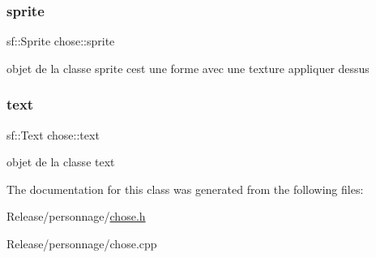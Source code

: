\subsubsection{\texorpdfstring{sprite}{sprite}}
{\footnotesize\ttfamily sf\+::\+Sprite chose\+::sprite}

objet de la classe sprite c\textquotesingle{}est une forme avec une texture appliquer dessus \mbox{\label{classchose_ab3a04062986c219d05889bd27e91625c}} 
\subsubsection{\texorpdfstring{text}{text}}
{\footnotesize\ttfamily sf\+::\+Text chose\+::text}

objet de la classe text 

The documentation for this class was generated from the following files\+:\begin{DoxyCompactItemize}
\item 
Release/personnage/\mbox{\hyperlink{chose_8h}{chose.\+h}}\item 
Release/personnage/chose.\+cpp\end{DoxyCompactItemize}
